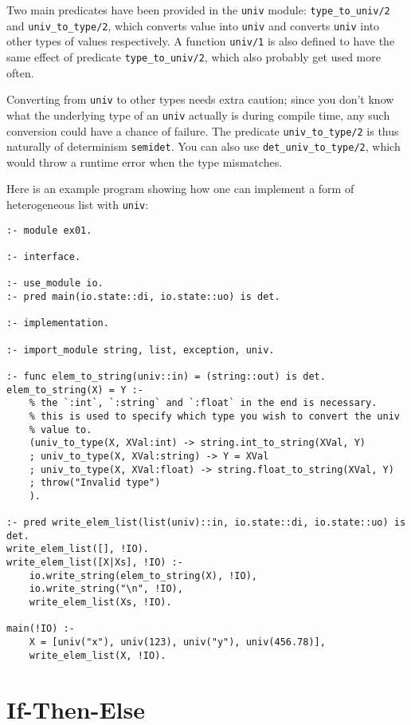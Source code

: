 Two main predicates have been provided in the \texttt{univ} module: \texttt{type_to_univ/2} and \texttt{univ_to_type/2}, which converts value into \texttt{univ} and converts \texttt{univ} into other types of values respectively. A function \texttt{univ/1} is also defined to have the same effect of predicate \texttt{type_to_univ/2}, which also probably get used more often.

Converting from \texttt{univ} to other types needs extra caution; since you don't know what the underlying type of an \texttt{univ} actually is during compile time, any such conversion could have a chance of failure. The predicate \texttt{univ_to_type/2} is thus naturally of determinism \texttt{semidet}. You can also use \texttt{det_univ_to_type/2}, which would throw a runtime error when the type mismatches.

Here is an example program showing how one can implement a form of heterogeneous list with \texttt{univ}:

\begin{lstlisting}[language=Mercury]
:- module ex01.

:- interface.

:- use_module io.
:- pred main(io.state::di, io.state::uo) is det.

:- implementation.

:- import_module string, list, exception, univ.

:- func elem_to_string(univ::in) = (string::out) is det.
elem_to_string(X) = Y :-
    % the `:int`, `:string` and `:float` in the end is necessary.
    % this is used to specify which type you wish to convert the univ
    % value to.
	(univ_to_type(X, XVal:int) -> string.int_to_string(XVal, Y)
	; univ_to_type(X, XVal:string) -> Y = XVal
	; univ_to_type(X, XVal:float) -> string.float_to_string(XVal, Y)
	; throw("Invalid type")
	).

:- pred write_elem_list(list(univ)::in, io.state::di, io.state::uo) is det.
write_elem_list([], !IO).
write_elem_list([X|Xs], !IO) :-
	io.write_string(elem_to_string(X), !IO),
	io.write_string("\n", !IO),
	write_elem_list(Xs, !IO).

main(!IO) :-
	X = [univ("x"), univ(123), univ("y"), univ(456.78)],
	write_elem_list(X, !IO).
\end{lstlisting}

\section{If-Then-Else}

